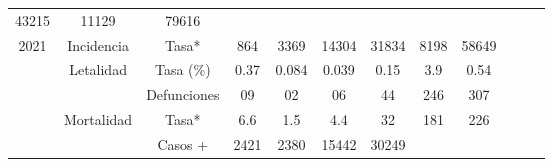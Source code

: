 \begin{tabular}{ccc|cccccc|lll}
		\multicolumn{1}{c|}{\cellcolor[HTML]{FFFC9E}43215} &
		\multicolumn{1}{c|}{\cellcolor[HTML]{FFFC9E}11129} &
		\cellcolor[HTML]{FFFC9E}79616 &
		&
		&
		\\ \cline{2-9}
		\multicolumn{1}{|c|}{\multirow{-5}{*}{\cellcolor[HTML]{FFFC9E}2021}} &
		\multicolumn{1}{c|}{\cellcolor[HTML]{FFFC9E}Incidencia} &
		\cellcolor[HTML]{FFFC9E}Tasa* &
		\multicolumn{1}{c|}{\cellcolor[HTML]{FFFC9E}864} &
		\multicolumn{1}{c|}{\cellcolor[HTML]{FFFC9E}3369} &
		\multicolumn{1}{c|}{\cellcolor[HTML]{FFFC9E}14304} &
		\multicolumn{1}{c|}{\cellcolor[HTML]{FFFC9E}31834} &
		\multicolumn{1}{c|}{\cellcolor[HTML]{FFFC9E}8198} &
		\cellcolor[HTML]{FFFC9E}58649 &
		&
		&
		\\ \cline{1-9}
		\multicolumn{1}{|c|}{\cellcolor[HTML]{C1EFC0}} &
		\multicolumn{1}{c|}{\cellcolor[HTML]{C1EFC0}Letalidad} &
		\cellcolor[HTML]{C1EFC0}Tasa (\%) &
		\multicolumn{1}{c|}{\cellcolor[HTML]{C1EFC0}0.37} &
		\multicolumn{1}{c|}{\cellcolor[HTML]{C1EFC0}0.084} &
		\multicolumn{1}{c|}{\cellcolor[HTML]{C1EFC0}0.039} &
		\multicolumn{1}{c|}{\cellcolor[HTML]{C1EFC0}0.15} &
		\multicolumn{1}{c|}{\cellcolor[HTML]{C1EFC0}3.9} &
		\cellcolor[HTML]{C1EFC0}0.54 &
		&
		&
		\\ \cline{3-9}
		\multicolumn{1}{|c|}{\cellcolor[HTML]{C1EFC0}} &
		\multicolumn{1}{c|}{\cellcolor[HTML]{C1EFC0}} &
		\cellcolor[HTML]{C1EFC0}Defunciones &
		\multicolumn{1}{c|}{\cellcolor[HTML]{C1EFC0}09} &
		\multicolumn{1}{c|}{\cellcolor[HTML]{C1EFC0}02} &
		\multicolumn{1}{c|}{\cellcolor[HTML]{C1EFC0}06} &
		\multicolumn{1}{c|}{\cellcolor[HTML]{C1EFC0}44} &
		\multicolumn{1}{c|}{\cellcolor[HTML]{C1EFC0}246} &
		\cellcolor[HTML]{C1EFC0}307 &
		&
		&
		\\ \cline{3-9}
		\multicolumn{1}{|c|}{\cellcolor[HTML]{C1EFC0}} &
		\multicolumn{1}{c|}{\cellcolor[HTML]{C1EFC0}Mortalidad} &
		\cellcolor[HTML]{C1EFC0}Tasa* &
		\multicolumn{1}{c|}{\cellcolor[HTML]{C1EFC0}6.6} &
		\multicolumn{1}{c|}{\cellcolor[HTML]{C1EFC0}1.5} &
		\multicolumn{1}{c|}{\cellcolor[HTML]{C1EFC0}4.4} &
		\multicolumn{1}{c|}{\cellcolor[HTML]{C1EFC0}32} &
		\multicolumn{1}{c|}{\cellcolor[HTML]{C1EFC0}181} &
		\cellcolor[HTML]{C1EFC0}226 &
		&
		&
		\\ \cline{3-9}
		\multicolumn{1}{|c|}{\cellcolor[HTML]{C1EFC0}} &
		\multicolumn{1}{c|}{\cellcolor[HTML]{C1EFC0}} &
		\cellcolor[HTML]{C1EFC0}Casos + &
		\multicolumn{1}{c|}{\cellcolor[HTML]{C1EFC0}2421} &
		\multicolumn{1}{c|}{\cellcolor[HTML]{C1EFC0}2380} &
		\multicolumn{1}{c|}{\cellcolor[HTML]{C1EFC0}15442} &
		\multicolumn{1}{c|}{\cellcolor[HTML]{C1EFC0}30249} &

\end{tabular}
